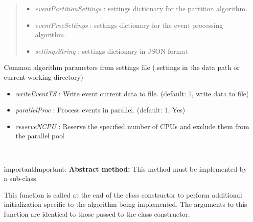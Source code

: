 \documentclass[letterpaper,10pt,english]{sphinxmanual}
\begin{document}
\begin{fulllineitems}
\begin{quote}
\begin{description}
\begin{itemize}
\begin{description}
\end{description}

\item {} 
\emph{eventPartitionSettings} :    settings dictionary for the partition algorithm.

\item {} 
\emph{eventProcSettings} :         settings dictionary for the event processing algorithm.

\item {} 
\emph{settingsString} :                    settings dictionary in JSON format

\end{itemize}

\end{description}\end{quote}

Common algorithm parameters from settings file (.settings in the data path or 
current working directory)
\begin{itemize}
\item {} 
\emph{writeEventTS} :      Write event current data to file. (default: 1, write data to file)

\item {} 
\emph{parallelProc} :      Process events in parallel. (default: 1, Yes)

\item {} 
\emph{reserveNCPU} :               Reserve the specified number of CPUs and exclude them from the parallel pool

\end{itemize}

\begin{fulllineitems}
\label{api-doc/mosaic.meta:mosaic.metaEventPartition.metaEventPartition._init}~
\begin{notice}{important}{Important:}
\textbf{Abstract method:} This method must be implemented by a sub-class.
\end{notice}

This function is called at the end of the class constructor to perform additional initialization specific to the algorithm being implemented. The arguments to this function are identical to those passed to the class constructor.

\end{fulllineitems}


\end{fulllineitems}
\end{document}
